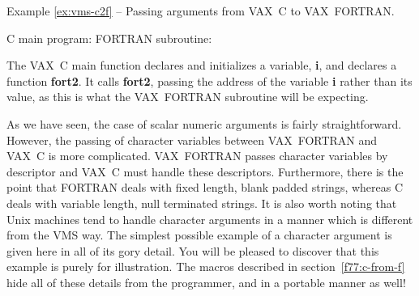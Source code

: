 \pagebreak[3]
\label{ex:vms-c2f}
\begin{center}
Example \ref{ex:vms-c2f} -- Passing arguments from VAX~C to VAX~FORTRAN.
\end{center}
\nopagebreak[4]
C main program:
\pagebreak[1]
FORTRAN subroutine:

The VAX~C main function declares and initializes a variable, {\bf i}, and declares
a function {\bf fort2}. It calls {\bf fort2}, passing the address of the
variable {\bf i} rather than its value, as this is what the VAX~FORTRAN subroutine
will be expecting.

As we have seen, the case of scalar numeric arguments is fairly
straightforward. However, the passing of character variables between VAX~FORTRAN
and VAX~C is more complicated. VAX~FORTRAN passes character variables by descriptor and
VAX~C must handle these descriptors. Furthermore, there is the point that FORTRAN
deals with fixed length, blank padded strings, whereas C deals with variable
length, null terminated strings. It is also worth noting that Unix machines
tend to handle character arguments in a manner which is different from the VMS
way. The simplest possible example of a character argument is given here in all
of its gory detail. You will be pleased to discover that this example is purely
for illustration. The macros described in section~\ref{f77:c-from-f} hide all
of these details from the programmer, and in a portable manner as well! 

